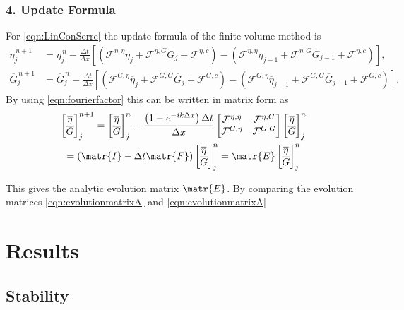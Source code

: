 \subsubsection{4. Update Formula} 
For \eqref{eqn:LinConSerre} the update formula of the finite volume method is
\begin{align*}
\overline{\eta}_{j}^{\,n + 1} &=  \overline{\eta}^{\,n }_{j} - \frac{\Delta t}{\Delta x}  \left[ \left(\mathcal{F}^{\eta,\eta} \overline{\eta}_j  + \mathcal{F}^{\eta,G} \overline{G}_j + \mathcal{F}^{\eta,c} \right) - \left(\mathcal{F}^{\eta,\eta} \overline{\eta}_{j-1}  + \mathcal{F}^{\eta,G} \overline{G}_{j-1} + \mathcal{F}^{\eta,c} \right)  \right], \\
\overline{G}^{\,n + 1}_{j} &= \overline{G}^{\,n }_{j} -\frac{\Delta t}{\Delta x}  \left[ \left(  \mathcal{F}^{G,\eta} \overline{\eta}_{j}  + \mathcal{F}^{G,G} \overline{G}_j + \mathcal{F}^{G,c} \right) - \left(  \mathcal{F}^{G,\eta} \overline{\eta}_{j-1}  + \mathcal{F}^{G,G} \overline{G}_{j-1} + \mathcal{F}^{G,c} \right) \right].
\end{align*}
By using \eqref{eqn:fourierfactor} this can be written in matrix form as
\begin{multline}
\begin{bmatrix}
\overline{\eta} \\ \overline{G}
\end{bmatrix}^{n+1}_j = \begin{bmatrix}
\overline{\eta} \\ \overline{G}
\end{bmatrix}^{n}_j - \frac{\left(1 - e^{-ik\Delta x}\right) \Delta t}{ \Delta x}\begin{bmatrix}
\mathcal{F}^{\eta,\eta} & \mathcal{F}^{\eta,G} \\\mathcal{F}^{G,\eta} &\mathcal{F}^{G,G} 
\end{bmatrix}\begin{bmatrix}
\overline{\eta} \\ \overline{G}
\end{bmatrix}^{n}_j \\= \left(\matr{I}  - \Delta t \matr{F} \right) \begin{bmatrix}
\overline{\eta} \\ \overline{G}
\end{bmatrix}^{n}_j = \matr{E} \begin{bmatrix}
\overline{\eta} \\ \overline{G}
\end{bmatrix}^{n}_j
\label{eqn:evolutionmatrixA}
\end{multline}

This gives the analytic evolution matrix $\matr{E}$. By comparing the evolution matrices \eqref{eqn:evolutionmatrixA} and \eqref{eqn:evolutionmatrixA}

\section{Results}



\subsection{Stability}
 